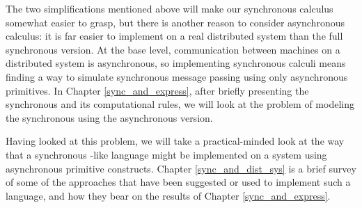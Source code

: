 The two simplifications mentioned above will make our synchronous calculus somewhat easier to grasp, but there is another reason to consider asynchronous calculus: it is far easier to implement on a real distributed system than the full synchronous version.  At the base level, communication between machines on a distributed system is asynchronous, so implementing synchronous calculi means finding a way to simulate synchronous message passing using only asynchronous primitives.  In Chapter \ref{sync_and_express}, after briefly presenting the synchronous \picalc and its computational rules, we will look at the problem of modeling the synchronous \picalc using the asynchronous version.

Having looked at this problem, we will take a practical-minded look at the way that a synchronous \picalc-like language might be implemented on a system using asynchronous primitive \picalc constructs. Chapter \ref{sync_and_dist_sys} is a brief survey of some of the approaches that have been suggested or used to implement such a language, and how they bear on the results of Chapter \ref{sync_and_express}.
